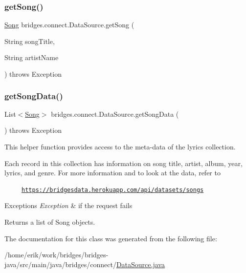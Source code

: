 \subsubsection{\texorpdfstring{get\+Song()}{getSong()}\hspace{0.1cm}{\footnotesize\ttfamily [2/2]}}
{\footnotesize\ttfamily \hyperlink{classbridges_1_1data__src__dependent_1_1_song}{Song} bridges.\+connect.\+Data\+Source.\+get\+Song (\begin{DoxyParamCaption}\item[{String}]{song\+Title,  }\item[{String}]{artist\+Name }\end{DoxyParamCaption}) throws Exception}

\mbox{\label{classbridges_1_1connect_1_1_data_source_ad4e2f30df95e8ce5976d0447c480522e}} 
\subsubsection{\texorpdfstring{get\+Song\+Data()}{getSongData()}}
{\footnotesize\ttfamily List$<$\hyperlink{classbridges_1_1data__src__dependent_1_1_song}{Song}$>$ bridges.\+connect.\+Data\+Source.\+get\+Song\+Data (\begin{DoxyParamCaption}{ }\end{DoxyParamCaption}) throws Exception}

This helper function provides access to the meta-\/data of the lyrics collection.

Each record in this collection has information on song title, artist, album, year, lyrics, and genre. For more information and to look at the data, refer to 

~~~~~\href{https://bridgesdata.herokuapp.com/api/datasets/songs}{\tt https\+://bridgesdata.\+herokuapp.\+com/api/datasets/songs} 


\begin{DoxyExceptions}{Exceptions}
{\em Exception} & if the request fails\\
\hline
\end{DoxyExceptions}
\begin{DoxyReturn}{Returns}
a list of Song objects. 
\end{DoxyReturn}


The documentation for this class was generated from the following file\+:\begin{DoxyCompactItemize}
\item 
/home/erik/work/bridges/bridges-\/java/src/main/java/bridges/connect/\hyperlink{connect_2_data_source_8java}{Data\+Source.\+java}\end{DoxyCompactItemize}
